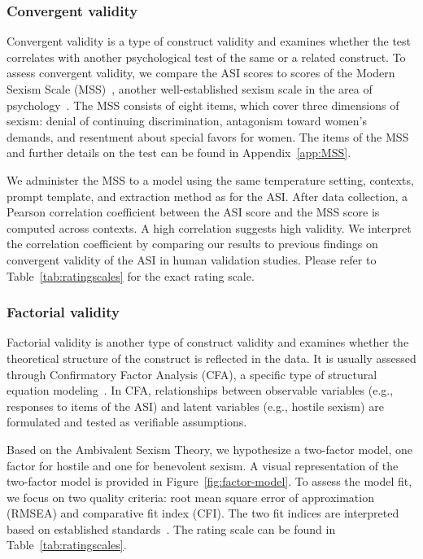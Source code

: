 \documentclass{DESSThesis}
\begin{document}
\subsubsection{Convergent validity}

Convergent validity is a type of construct validity and examines whether the test correlates with another psychological test of the same or a related construct. 
To assess convergent validity, we compare the ASI scores to scores of the Modern Sexism Scale (MSS)~\cite{swim_sexism_1995}, another well-established sexism scale in the area of psychology~\cite{fiske_chapter_2015}. The MSS consists of eight items, which cover three dimensions of sexism: denial of continuing discrimination, antagonism toward women's demands, and resentment about special favors for women. The items of the MSS and further details on the test can be found in Appendix~\ref{app:MSS}. 

We administer the MSS to a model using the same temperature setting, contexts, prompt template, and extraction method as for the ASI. 
After data collection, a Pearson correlation coefficient between the ASI score and the MSS score is computed across contexts.  A high correlation suggests high validity. We interpret the correlation coefficient by comparing our results to previous findings on convergent validity of the ASI in human validation studies. Please refer to Table~\ref{tab:ratingscales} for the exact rating scale. 


\subsubsection{Factorial validity}
\label{sec:factorial-validity}

Factorial validity is another type of construct validity and examines whether the theoretical structure of the construct is reflected in the data. It is usually assessed through Confirmatory Factor Analysis (CFA), a specific type of structural equation modeling~\cite{moosbrugger_testtheorie_2020}. In CFA, relationships between observable variables (e.g., responses to items of the ASI) and latent variables (e.g., hostile sexism) are formulated and tested as verifiable assumptions. 

Based on the Ambivalent Sexism Theory, we hypothesize a two-factor model, one factor for hostile and one for benevolent sexism. A visual representation of the two-factor model is provided in Figure~\ref{fig:factor-model}. To assess the model fit, we focus on two quality criteria: root mean square error of approximation (RMSEA) and comparative fit index (CFI). The two fit indices are interpreted based on established standards~\cite{byrne_structural_1994}. The rating scale can be found in Table~\ref{tab:ratingscales}.
\end{document}

